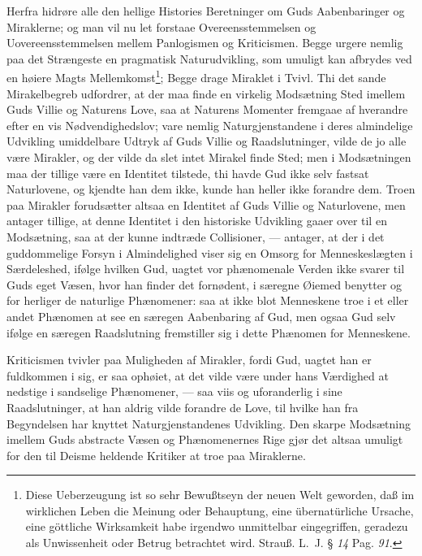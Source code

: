 \documentclass[12pt]{book}
\newcommand{\opage}[1]{\marginnote{\footnotesize\textit{[#1]}}}
\begin{document}
Herfra hidrøre alle den hellige Histories Beretninger om Guds Aabenbaringer og
Miraklerne; og man vil nu let forstaae Overeensstemmelsen og
Uovereensstemmelsen mellem Panlogismen og Kriticismen. Begge urgere nemlig paa
det Strængeste en pragmatisk Naturudvikling, som umuligt kan afbrydes ved en
høiere Magts Mellemkomst\footnote{Diese Ueberzeugung ist so sehr Bewußtseyn der
neuen Welt geworden, daß im wirklichen Leben die Meinung oder Behauptung, eine
übernatürliche Ursache, eine göttliche Wirksamkeit habe irgendwo unmittelbar
eingegriffen, geradezu als Unwissenheit oder Betrug betrachtet wird. Strauß.
L.~J. § \textit{14} Pag. \textit{91}.}; Begge drage Miraklet i Tvivl. Thi det
sande Mirakelbegreb udfordrer, at der maa finde en virkelig Modsætning Sted
imellem Guds Villie og Naturens Love, saa at Naturens Momenter fremgaae af
hverandre efter en vis Nødvendighedslov; vare nemlig Naturgjenstandene i deres
almindelige Udvikling umiddelbare Udtryk af Guds Villie og Raadslutninger,
vilde de jo alle være Mirakler, og der vilde da slet intet Mirakel finde Sted;
men i Modsætningen maa der tillige være en Identitet tilstede, thi havde Gud
ikke selv fastsat Naturlovene, og kjendte han dem ikke, kunde han heller ikke
forandre dem. Troen paa Mirakler forudsætter altsaa en Identitet af Guds Villie
og Naturlovene, men antager tillige, at denne Identitet i den historiske
Udvikling gaaer over til en Modsætning, saa at der kunne indtræde Collisioner,
--- antager, at der i det guddommelige Forsyn i Almindelighed viser sig en
Omsorg for Menneskeslægten i Særdeleshed, ifølge hvilken Gud, uagtet vor
phænomenale Verden ikke svarer til Guds eget Væsen, hvor han finder det
fornødent, i særegne Øiemed benytter og for\-%
\opage{130}herliger de naturlige Phænomener: saa at ikke blot Menneskene troe i et eller
andet Phænomen at see en særegen Aabenbaring af Gud, men ogsaa Gud selv ifølge
en særegen Raadslutning fremstiller sig i dette Phænomen for Menneskene.

Kriticismen tvivler paa Muligheden af Mirakler, fordi Gud, uagtet han er
fuldkommen i sig, er saa ophøiet, at det vilde være under hans Værdighed at
nedstige i sandselige Phænomener, --- saa viis og uforanderlig i sine
Raadslutninger, at han aldrig vilde forandre de Love, til hvilke han fra
Begyndelsen har knyttet Naturgjenstandenes Udvikling. Den skarpe Modsætning
imellem Guds abstracte Væsen og Phænomenernes Rige gjør det altsaa umuligt for
den til Deisme heldende Kritiker at troe paa Miraklerne.
\end{document}

